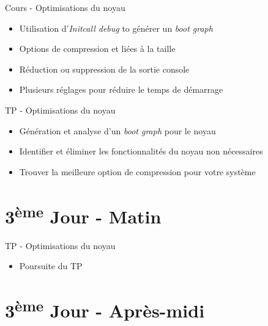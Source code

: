 \documentclass[a4paper,12pt,obeyspaces,spaces,hyphens]{article}
\begin{document}
\feagendatwocolumn
{Cours - Optimisations du noyau}
{
  \begin{itemize}
  \item Utilisation d'{\em Initcall debug} to générer un {\em boot graph}
  \item Options de compression et liées à la taille
  \item Réduction ou suppression de la sortie console
  \item Plusieurs réglages pour réduire le temps de démarrage
  \end{itemize}
}
{TP - Optimisations du noyau}
{
 \begin{itemize}
 \item Génération et analyse d'un {\em boot graph} pour le noyau
 \item Identifier et éliminer les fonctionnalités du noyau non nécessaires
 \item Trouver la meilleure option de compression pour votre système
 \end{itemize}
}

\section{3\textsuperscript{ème} Jour - Matin}

\feagendaonecolumn
{TP - Optimisations du noyau}
{
 \begin{itemize}
 \item Poursuite du TP
 \end{itemize}
}

\section{3\textsuperscript{ème} Jour - Après-midi}
\end{document}
